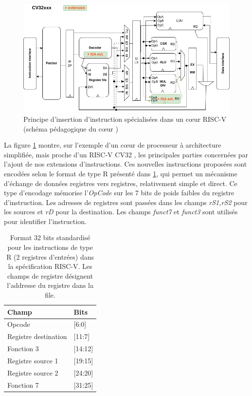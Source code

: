\documentclass[../main.tex]{subfiles}
\begin{document}
\begin{figure}
\centering
\includegraphics[scale=0.5]{chapter3/figs/CV32xxx+Ext.png}
\caption{Principe d'insertion d'instruction spécialisées dans un cœur RISC-V (schéma pédagogique du cœur \cite{ArchiRISC:V})}
\label{RV2regs}
\end{figure}

La figure \ref{RV2regs} montre, sur l'exemple d’un cœur de processeur à architecture simplifiée, mais proche d'un RISC-V CV32 \cite{ArchiRISC:V}, les principales parties concernées par l'ajout de nos extensions d'instructions.
Ces nouvelles instructions proposées sont encodées selon le format de type R présenté dans \ref{R_instruction}, qui permet un mécanisme d'échange de données registres vers registres, relativement simple et direct. Ce type d'encodage mémorise l'\textit{OpCode} sur les 7 bits de poids faibles du registre d'instruction. Les adresses de registres sont passées dans les champs \textit{rS1,rS2} pour les sources et \textit{rD} pour la destination. Les champs \textit{funct7} et \textit{funct3} sont utilisés pour identifier l'instruction.

\begin{table}[]
    \centering
    \begin{tabular}{l|l}
         \textbf{Champ} & \textbf{Bits}  \\
         \bottomrule
         Opcode                 & [6:0]  \\
         Registre destination   & [11:7]  \\
         Fonction 3             & [14:12]  \\
         Registre source 1      & [19:15]  \\
         Registre source 2      & [24:20]  \\
         Fonction 7             & [31:25]  \\
    \end{tabular}
    \caption{Format 32 bits standardisé pour les instructions de type R (2 registres d'entrées) dans la spécification RISC-V. Les champs de registre désignent l'addresse du registre dans la file.}
    \label{R_instruction}
\end{table}
\end{document}
